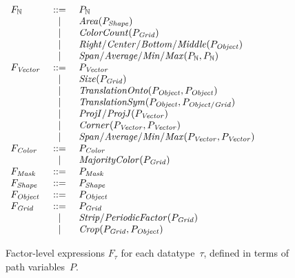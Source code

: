 \documentclass[a4paper]{llncs}
\newenvironment{datatype}{$\begin{array}{lcl}}{\end{array}$}
\newcommand{\is}{&\ ::=\ &}
\newcommand{\altis}{\\ &\ \mid\ &}
\newcommand{\nat}{\mathbb{N}}
\begin{document}
\begin{figure}[t!]
\begin{center}
  \begin{datatype}
    F_\nat \is P_\nat
    \altis {\it Area}(P_{\it Shape})
    \altis {\it ColorCount}(P_{\it Grid})
    \altis {\it Right/Center/Bottom/Middle}(P_{\it Object})
    \altis {\it Span/Average/Min/Max}(P_\nat, P_\nat)
    \\
    F_{\it Vector} \is P_{\it Vector}
    \altis {\it Size}(P_{\it Grid})
    \altis {\it TranslationOnto}(P_{\it Object},P_{\it Object})
    \altis {\it TranslationSym}(P_{\it Object},P_{\it Object/Grid})
    \altis {\it ProjI/ProjJ}(P_{\it Vector})
    \altis {\it Corner}(P_{\it Vector}, P_{\it Vector})
    \altis {\it Span/Average/Min/Max}(P_{\it Vector}, P_{\it Vector})
    \\
    F_{\it Color} \is P_{\it Color}
    \altis {\it MajorityColor}(P_{\it Grid})
    \\
    F_{\it Mask} \is P_{\it Mask}
    \\
    F_{\it Shape} \is P_{\it Shape}
    \\
    F_{\it Object} \is P_{\it Object}
    \\
    F_{\it Grid} \is P_{\it Grid}
    \altis {\it Strip/PeriodicFactor}(P_{\it Grid})
    \altis {\it Crop}(P_{\it Grid}, P_{\it Object})
  \end{datatype}
\end{center}
\caption{Factor-level expressions $F_\tau$ for each datatype~$\tau$, defined in terms of path variables~$P$.}
\label{fig:expressions1}
\end{figure}
\end{document}
